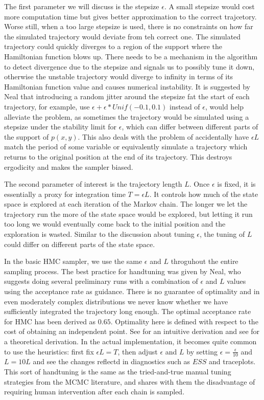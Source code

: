 \documentclass{book}
\begin{document}
\begin{enumerate}
The first parameter we will discuss is the stepsize $\epsilon$. A small stepsize would cost more computation time but gives better approximation to the correct trajcetory. Worse still, when a too large stepsize is used, there is no constraints on how far the simulated trajectory would deviate from teh correct one. The simulated trajectory could quickly diverges to a region of the support where the Hamiltonian function blows up. There needs to be a mechanism in the algorithm to detect divergence due to the stepsize and signals us to possibly tune it down, otherwise the unstable trajectory would diverge to infinity in terms of its Hamiltonian function value and causes numerical instability. It is suggested by Neal that introducing a random jitter around the stepsize fat the start of each trajectory, for example, use $\epsilon + \epsilon*Unif(-0.1,0.1)$ instead of $\epsilon$,  would help alleviate the problem, as sometimes the trajectory would be simulated using a stepsize under the stability limit for $\epsilon$, which can differ between different parts of the support of $p(x,y)$. This also deals with the problem of accidentally have $\epsilon L$ match the period of some variable or equivalently simulate a trajectory which returns to the original position at the end of its trajectory. This destroys ergodicity and makes the sampler biased.

The second parameter of interest is the trajectory length $L$. Once $\epsilon$ is fixed, it is essentially a proxy for integration time $T= \epsilon L$. It controls how much of the state space is explored at each iteration of the Markov chain. The longer we let the trajectory run the more of the state space would be explored, but letting it run too long we would eventually come back to the initial position and the exploration is wasted. Similar to the discussion about tuning $\epsilon$, the tuning of $L$ could differ on different parts of the state space. 

In the basic HMC sampler, we use the same $\epsilon$ and $L$ throguhout the entire sampling process. The best practice for handtuning was given by Neal, who suggests doing several preliminary runs with a combination of $\epsilon$ and $L$ values using the acceptance rate as guidance. There is no guarantee of optimality and in even moderately complex distributions we never know whether we have sufficiently integrated the trajectory long enough. The optimal acceptance rate for HMC has been derived as $0.65$. Optimality here is defined with respect to the cost of obtaining an independent point. See \cite{neal} for an intuitive derivation and see \cite{} for a theoretical derivation. In the actual implementation, it becomes quite common to use the heuristics: first fix $\epsilon L = T$, then adjust $\epsilon$ and $L$ by setting $\epsilon = \frac{\epsilon}{10} $ and $L = 10L$ and see the changes reflectd in diagnostics such as $ESS$ and traceplots. This sort of handtuning is the same as the tried-and-true manual tuning strategies from the MCMC literature, and shares with them the disadvantage of requiring human intervention after each chain is sampled. 




\end{enumerate}
\end{document}
